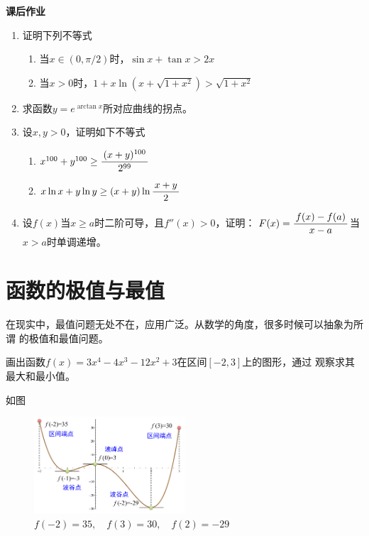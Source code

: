 \begin{ext}
	{\bf 课后作业}
	
	\begin{enumerate}
	  \item 证明下列不等式
		\begin{enumerate}[(1)]
		  \item 当$x\in(0,\pi/2)$时，$\sin x+\tan x>2x$
		  \item 当$x>0$时，$1+x\ln(x+\sqrt{1+x^2})>\sqrt{1+x^2}$
		\end{enumerate}
	  \item 求函数$y=e^{\arctan x}$所对应曲线的拐点。
	  \item 设$x,y>0$，证明如下不等式
	  \begin{enumerate}[(1)]
		\item $x^{100}+y^{100}\geq\displaystyle\frac{\,{(x+y)^{100}}\,}{\,{2^{99}}\,}$
		\item $x\ln x+y\ln y\geq (x+y)\ln\displaystyle\frac{\,{x+y}\,}{\,{2}\,}$
	  \end{enumerate}
	  \item 设$f(x)$当$x\geq a$时二阶可导，且$f''(x)>0$，证明：
	  $F(x)=\displaystyle\frac{\,{f(x)-f(a)}\,}{\,{x-a}\,}$当$x>a$时单调递增。
	\end{enumerate}
\end{ext}

\section{函数的极值与最值}

在现实中，最值问题无处不在，应用广泛。从数学的角度，很多时候可以抽象为所谓
的极值和最值问题。

\egz 画出函数$f(x)=3x^4-4x^3-12x^2+3$在区间$[-2,3]$上的图形，通过
观察求其最大和最小值。

如图
	
\begin{figure}[h]
	\centering
	\includegraphics[width=0.5\textwidth]
	{./Images/Ch03/fmm_pt.pdf}
	\caption{$f(-2)=35,\quad f(3)=30,\quad f(2)=-29$}
	\label{fig:fmm_pt}
\end{figure}

